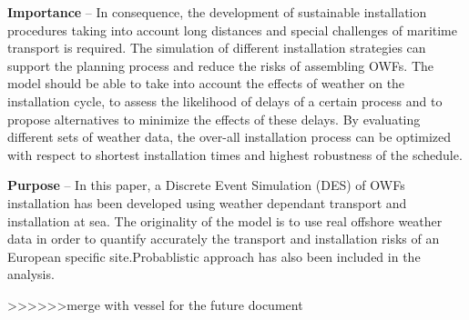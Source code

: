 \textbf{Importance} --
In consequence, the development of sustainable installation procedures taking into account long distances and special challenges of maritime transport is required. The simulation of different installation strategies can support the planning process and reduce the risks of assembling OWFs. The model should be able to take into account the effects of weather on the installation cycle, to assess the likelihood of delays of a certain process and to propose alternatives to minimize the effects of these delays. By evaluating different sets of weather data, the over-all installation process can be optimized with respect to shortest installation times and highest robustness of the schedule.

\textbf{Purpose} --
In this paper, a Discrete Event Simulation (DES) of OWFs installation has been developed using weather dependant transport and installation at sea. The originality of the model is to use real offshore weather data in order to quantify accurately the transport and installation risks of an European specific site.Probablistic approach has also been included in the analysis.


>>>>>>merge with vessel for the future document